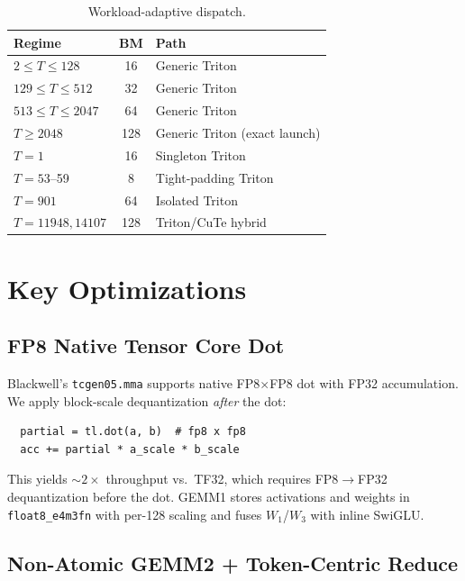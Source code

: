 \documentclass[11pt,twocolumn]{article}
\begin{document}
\begin{table}[H]
\centering
\scriptsize
\setlength{\tabcolsep}{2pt}
\caption{Workload-adaptive dispatch.}
\label{tab:dispatch}
\begin{tabular}{@{}L{0.34\columnwidth}c L{0.41\columnwidth}@{}}
\toprule
Regime & BM & Path \\
\midrule
$2 \le T \le 128$ & 16 & Generic Triton \\
$129 \le T \le 512$ & 32 & Generic Triton \\
$513 \le T \le 2047$ & 64 & Generic Triton \\
$T \ge 2048$ & 128 & Generic Triton (exact launch) \\
\addlinespace
$T{=}1$ & 16 & Singleton Triton \\
$T{=}53$--59 & 8 & Tight-padding Triton \\
$T{=}901$ & 64 & Isolated Triton \\
$T{=}11948,14107$ & 128 & Triton/CuTe hybrid \\
\bottomrule
\end{tabular}
\end{table}

\section{Key Optimizations}

\subsection{FP8 Native Tensor Core Dot}

Blackwell's \texttt{tcgen05.mma} supports native FP8$\times$FP8 dot with FP32 accumulation. We apply block-scale dequantization \emph{after} the dot:

\vspace{-2mm}
\begin{verbatim}
  partial = tl.dot(a, b)  # fp8 x fp8
  acc += partial * a_scale * b_scale
\end{verbatim}
\vspace{-2mm}

This yields ${\sim}2\times$ throughput vs.\ TF32, which requires FP8$\to$FP32 dequantization before the dot. GEMM1 stores activations and weights in \texttt{float8\_e4m3fn} with per-128 scaling and fuses $W_1$/$W_3$ with inline SwiGLU.

\subsection{Non-Atomic GEMM2 + Token-Centric Reduce}
\end{document}
